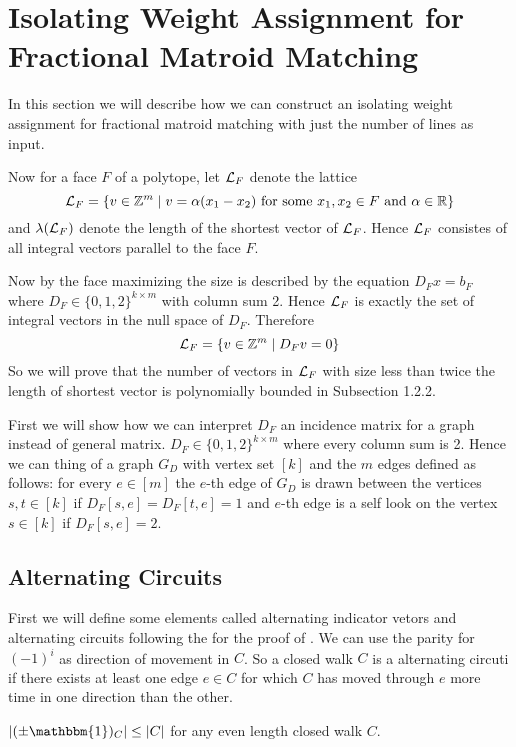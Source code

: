 \section{Isolating Weight Assignment for Fractional Matroid Matching}
In this section we will describe how we can construct an isolating weight assignment for fractional matroid matching with just the number of lines as input.

Now for a face $F$ of a polytope, let $\mathcal{L}_F$ denote the lattice $$\mathcal{L}_F=\{v\in\mathbb{Z}^{m}\mid v=\alpha(x_1-x_2)\text{  for some $x_1,x_2\in F$ and $\alpha\in\mathbb{R}$}\}$$and $\lambda(\mathcal{L}_F)$ denote the length of the shortest vector of $\mathcal{L}_F$. Hence $\mathcal{L}_F$ consistes of all integral vectors parallel to the face $F$.

Now by  the face maximizing the size is described by the equation $D_Fx=b_F$ where $D_F\in \{0,1,2\}^{k\times m}$ with column sum 2. Hence $\mathcal{L}_F$ is exactly the set of integral vectors in the null space of $D_F$. Therefore $$\mathcal{L}_F=\{v\in\mathbb{Z}^{m}\mid D_Fv=0\}$$So we will prove that the number of vectors in $\mathcal{L}_F$ with size less than twice the length of shortest vector is polynomially bounded in Subsection 1.2.2.

First we will show how we can interpret $D_F$ an incidence matrix for a graph instead of general matrix. $D_F\in \{0,1,2\}^{k\times m}$ where every column sum is 2. Hence we can thing of a graph $G_D$ with vertex set $[k]$ and the $m$ edges defined as follows: for every $e\in [m]$ the $e$-th edge of $G_D$ is drawn between the vertices $s,t\in[k]$ if $D_F[s,e]=D_F[t,e]=1$ and $e$-th edge is a self look on the vertex $s\in[k]$ if $D_F[s,e]=2$.  
\subsection{Alternating Circuits}
First we will define some elements called alternating indicator vetors and alternating circuits following the \cite{generalmatchingola} for the proof of .
We can use the parity for $(-1)^{i}$ as direction of movement in $C$. So a closed walk $C$ is a alternating circuti if there exists at least one edge $e\in C$ for which $C$ has moved through $e$ more time in one direction than the other.
\begin{observation*}
	$|(\pm \mathbbm{1})_C|\leq |C|$ for any even length closed walk $C$.
\end{observation*}


